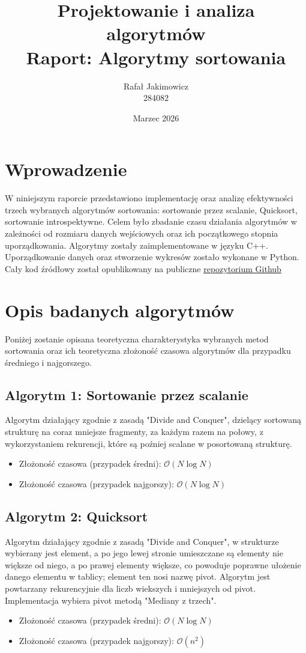 \documentclass[12pt, a4paper]{article}
\title{Projektowanie i analiza algorytmów\\ \large Raport: Algorytmy sortowania}
\author{Rafał Jakimowicz \\ 284082}
\date{Marzec 2026}
\begin{document}
\maketitle
\tableofcontents
\listoffigures
\listoftables
\newpage

\section{Wprowadzenie}
W niniejszym raporcie przedstawiono implementację oraz analizę efektywności trzech wybranych algorytmów sortowania: sortowanie przez scalanie, Quicksort, sortowanie introspektywne. Celem było zbadanie czasu działania algorytmów w zależności od rozmiaru danych wejściowych oraz ich początkowego stopnia uporządkowania. Algorytmy zostały zaimplementowane w języku C++. Uporządkowanie danych oraz stworzenie wykresów zostało wykonane w Python. Cały kod źródłowy został opublikowany na publiczne  \href{https://github.com/RafalJakimowicz/PiAASortowanie}{repozytorium Github}

\section{Opis badanych algorytmów}
Poniżej zostanie opisana teoretyczna charakterystyka wybranych metod sortowania oraz ich teoretyczna złożoność czasowa algorytmów dla przypadku średniego i najgorszego.

\subsection{Algorytm 1: Sortowanie przez scalanie}
Algorytm działający zgodnie z zasadą "Divide and Conquer", dzielący sortowaną strukturę na coraz mniejsze fragmenty, za każdym razem na połowy, z wykorzystaniem rekurencji, które są poźniej scalane w posortowaną strukturę. 
\begin{itemize}
    \item Złożoność czasowa (przypadek średni): $\mathcal{O}(N\log{N})$
    \item Złożoność czasowa (przypadek najgorszy): $\mathcal{O}(N\log{N})$
\end{itemize}

\subsection{Algorytm 2: Quicksort}
Algorytm działający zgodnie z zasadą "Divide and Conquer", w strukturze wybierany jest element, a po jego lewej stronie umieszczane są elementy nie większe od niego, a po prawej elementy większe, co powoduje poprawne ułożenie danego elementu w tablicy; element ten nosi nazwę pivot. Algorytm jest powtarzany rekurencyjnie dla liczb wiekszych i mniejszych od pivot. Implementacja wybiera pivot metodą "Mediany z trzech".
\begin{itemize}
    \item Złożoność czasowa (przypadek średni): $\mathcal{O}(N\log{N})$
    \item Złożoność czasowa (przypadek najgorszy): $\mathcal{O}(n^2)$
\end{itemize}
\end{document}
